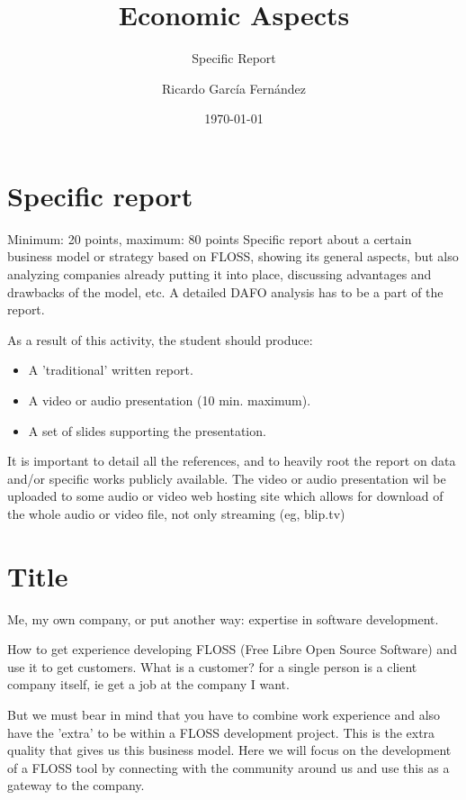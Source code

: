 \documentclass[11pt]{scrartcl}
\title{\textbf{Economic Aspects\\}}
\subtitle{Specific Report}
\author{Ricardo Garc\'ia Fern\'andez}
\date{\today}
\begin{document}
\maketitle

\section{Specific report}

Minimum: 20 points, maximum: 80 points
Specific report about a certain business model or strategy based on FLOSS, showing its general aspects, but also analyzing companies already putting it into place, discussing advantages and drawbacks of the model, etc. A detailed DAFO analysis has to be a part of the report.

As a result of this activity, the student should produce:
\begin{itemize}
    \item A 'traditional' written report.
    \item A video or audio presentation (10 min. maximum).
    \item A set of slides supporting the presentation.
\end{itemize}

It is important to detail all the references, and to heavily root the report on data and/or specific works publicly available. The video or audio presentation wil be uploaded to some audio or video web hosting site which allows for download of the whole audio or video file, not only streaming (eg, blip.tv)

\section{Title}

\par Me, my own company, or put another way: expertise in software development.

\par How to get experience developing FLOSS (Free Libre Open Source Software) and use it to get customers. What is a customer? for a single person is a client company itself, ie get a job at the company I want.

\par But we must bear in mind that you have to combine work experience and also have the 'extra' to be within a FLOSS development project. This is the extra quality that gives us this business model. Here we will focus on the development of a FLOSS tool by connecting with the community around us and use this as a gateway to the company.
\end{document}

